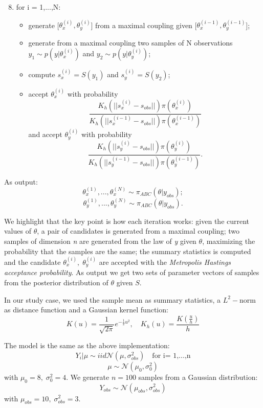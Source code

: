 \documentclass {article}
\begin{document}
\begin{enumerate}
	\setcounter{enumi}{7}	
	
	\item for i = 1,...,N:
	\begin{itemize}
		\item generate [$\theta_{x}^{(i)},\theta_{y}^{(i)}$] from a maximal coupling given [$\theta_{x}^{(i-1)},\theta_{y}^{(i-1)}$];
		\item generate from a maximal coupling two samples of N observations $y_{1} \sim p(y|\theta_{x}^{(i)})$ and $y_{2} \sim p(y|\theta_{y}^{(i)})$;
		\item compute $s_{x}^{(i)}=S(y_{1})$ and $s_{y}^{(i)}=S(y_{2})$;
		\item accept $\theta_{x}^{(i)}$ with probability 
		$$
		\frac{
			K_h(||s_{x}^{(i)}-s_{obs}||)\pi(\theta_{x}^{(i)})
		}{
			K_h(||s_{x}^{(i-1)}-s_{obs}||)\pi(\theta_{x}^{(i-1)})
		}
		$$
		and accept $\theta_{y}^{(i)}$ with probability
		$$
		\frac{
			K_h(||s_{y}^{(i)}-s_{obs}||)\pi(\theta_{y}^{(i)})
		}{
			K_h(||s_{y}^{(i-1)}-s_{obs}||)\pi(\theta_{y}^{(i-1)})
		}.
		$$ 
	\end{itemize}
	
	
\end{enumerate}


As output: 
$$\theta_{x}^{(1)},...,\theta_{x}^{(N)}\sim \pi_{ABC} (\theta|y_{obs});$$
$$\theta_{y}^{(1)},...,\theta_{y}^{(N)} \sim \pi_{ABC} (\theta|y_{obs}).$$


\vspace{0.2cm}
We highlight that the key point is how each iteration works:
given the current values of $\theta$, a pair of candidates is generated from a maximal coupling; two samples of dimension \emph{n} are generated from the law of \emph{y} given $\theta$, maximizing the probability that the samples are the same;
the summary statistics is computed and the candidate $\theta_x ^{(i)}, \; \theta_y ^{(i)}$ are accepted with the \emph{Metropolis Hastings acceptance probability}. As output  we get two sets of parameter vectors of samples from the posterior distribution of $\theta$ given $S$.

In our study case, we used the sample mean as summary statistics, a $L^2-$norm as distance function and a Gaussian kernel function:
	$$
K(u) = 
\frac{1}{\sqrt{2\pi}} e^{-\frac{1}{2}u^2}, 
\quad K_h(u) 
= \frac{K(\frac u h)}{h}
$$ 

The model is the same as the above implementation: 
$$ Y_i | \mu \sim{iid} \mathcal{N}(\mu, \sigma_{obs} ^2) \quad \text{for i= 1,...,n} $$
$$ \mu  \sim \mathcal{N}(\mu_0, \sigma_0^2)$$
with $\mu_0 = 8, \; \sigma^2_0 = 4$.
We generate $n= 100$ samples from a Gaussian distribution:
$$
Y_{obs} \sim \mathcal{N}(\mu_{obs}, \sigma_{obs} ^2)
$$
with
$
\mu_{obs} = 10, \;
\sigma_{obs} ^2 = 3
$.
\end{document}
